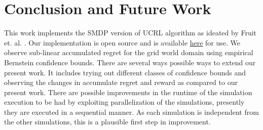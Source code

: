 
\chapter{Conclusion and Future Work}

This work implements the SMDP version of UCRL algorithm as ideated by Fruit et. al. \cite{fruit_regret_2017}.
Our implementation is open source and is available \href{https://github.com/repo-goes-here}{here} for use.
We observe sub-linear accumulated regret for the grid world domain using empirical Bernstein confidence bounds.
There are several ways possible ways to extend our present work.
It includes trying out different classes of confidence bounds and observing the changes in accumulate regret and reward as compared to our present work.
There are possible improvements in the runtime of the simulation execution to be had by exploiting parallelization of the simulations, presently they are executed in a sequential manner.
As each simulation is independent from the other simulations, this is a plausible first step in improvement.

\newpage
